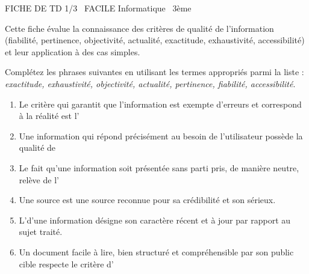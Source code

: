 \documentclass[11pt]{article}
\begin{document}
\begin{tcolorbox}[enhanced,colback=popink,colframe=popink,arc=10pt,boxrule=0pt,left=12pt,right=12pt,top=9pt,bottom=9pt]
{\color{white}\popxbold\small FICHE DE TD 1/3 \textbullet\ FACILE \hfill Informatique \textbullet\ 3ème\par}
\end{tcolorbox}
\vspace{4pt}
\noindent Cette fiche évalue la connaissance des critères de qualité de l'information (fiabilité, pertinence, objectivité, actualité, exactitude, exhaustivité, accessibilité) et leur application à des cas simples.

\begin{exercice}
Complétez les phrases suivantes en utilisant les termes appropriés parmi la liste : \textit{exactitude, exhaustivité, objectivité, actualité, pertinence, fiabilité, accessibilité}.
\begin{enumerate}
    \item Le critère qui garantit que l'information est exempte d'erreurs et correspond à la réalité est l'\dotfill
    \item Une information qui répond précisément au besoin de l'utilisateur possède la qualité de \dotfill
    \item Le fait qu'une information soit présentée sans parti pris, de manière neutre, relève de l'\dotfill
    \item Une source \dotfill est une source reconnue pour sa crédibilité et son sérieux.
    \item L'\dotfill d'une information désigne son caractère récent et à jour par rapport au sujet traité.
    \item Un document facile à lire, bien structuré et compréhensible par son public cible respecte le critère d'\dotfill
\end{enumerate}
\end{exercice}
\end{document}
